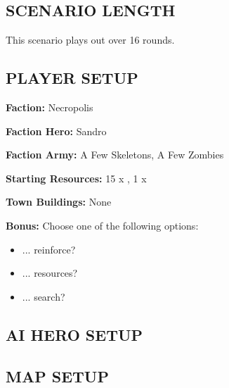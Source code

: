 
\begin{multicols*}{2}


\subsection*{\MakeUppercase{Scenario length}}

This scenario plays out over 16 rounds.

\subsection*{\MakeUppercase{Player setup}}

\textbf{Faction:} Necropolis

\textbf{Faction Hero:} Sandro

\textbf{Faction Army:} A Few Skeletons, A Few Zombies

\textbf{Starting Resources:} 15 x \gold, 1 x \valuables

\textbf{Town Buildings:} None 

\textbf{Bonus:} Choose one of the following options: 

\begin{itemize}
    \item ... reinforce?
    \item ... resources?
    \item ... search?
\end{itemize}

\subsection*{\MakeUppercase{AI hero setup}}

\subsection*{\MakeUppercase{Map setup}}


\end{multicols*}
